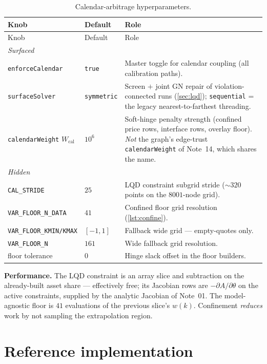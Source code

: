 \documentclass[11pt]{article}
\begin{document}
\begin{longtable}{p{}p{}p{}}
\caption{Calendar-arbitrage hyperparameters.}\label{tab:atlas}\\
\toprule Knob & Default & Role\\ \midrule
\endfirsthead \toprule Knob & Default & Role\\ \midrule \endhead
\multicolumn{3}{l}{\emph{Surfaced}}\\ \midrule
\texttt{enforceCalendar} & \texttt{true} & Master toggle for calendar
coupling (all calibration paths).\\
\texttt{surfaceSolver} & \texttt{symmetric} & Screen $+$ joint GN repair of
violation-connected runs (\cref{sec:lqd}); \texttt{sequential} = the legacy
nearest-to-farthest threading.\\
\texttt{calendarWeight} $W_{\text{cal}}$ & $10^{6}$ & Soft-hinge penalty
strength (confined price rows, interface rows, overlay floor). \emph{Not}
the graph's edge-trust \texttt{calendarWeight} of Note~14, which shares the
name.\\
\midrule
\multicolumn{3}{l}{\emph{Hidden}}\\ \midrule
\texttt{CAL\_STRIDE} & $25$ & LQD constraint subgrid stride ($\sim320$
points on the $8001$-node grid).\\
\texttt{VAR\_FLOOR\_N\_DATA} & $41$ & Confined floor grid resolution
(\cref{lst:confine}).\\
\texttt{VAR\_FLOOR\_KMIN/KMAX} & $[-1,1]$ & Fallback wide grid ---
empty-quotes only.\\
\texttt{VAR\_FLOOR\_N} & $161$ & Wide fallback grid resolution.\\
floor tolerance & $0$ & Hinge slack offset in the floor builders.\\
\bottomrule
\end{longtable}

\noindent\textbf{Performance.} The LQD constraint is an array slice and
subtraction on the already-built asset share --- effectively free; its
Jacobian rows are $-\partial A/\partial\theta$ on the active constraints,
supplied by the analytic Jacobian of Note~01. The model-agnostic floor is
$41$ evaluations of the previous slice's $w(k)$. Confinement \emph{reduces}
work by not sampling the extrapolation region.

\section{Reference implementation}
\label{app:ref}
\end{document}
